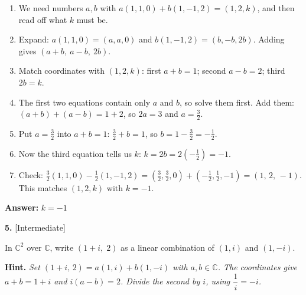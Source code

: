 \documentclass[11pt]{article}
\begin{document}
\begin{tcolorbox}[breakable,colback=ans,colframe=ansb,boxrule=0.5pt,left=4pt,right=4pt,top=2pt,bottom=2pt]\begin{enumerate}[leftmargin=2.2em,itemsep=1pt,topsep=1pt,label=\textbf{Step \arabic*.}]\item We need numbers $a,b$ with $a(1,1,0)+b(1,-1,2)=(1,2,k)$, and then read off what $k$ must be.
\item Expand: $a(1,1,0)=(a,a,0)$ and $b(1,-1,2)=(b,-b,2b)$. Adding gives $(a+b,\ a-b,\ 2b)$.
\item Match coordinates with $(1,2,k)$: first $a+b=1$; second $a-b=2$; third $2b=k$.
\item The first two equations contain only $a$ and $b$, so solve them first. Add them: $(a+b)+(a-b)=1+2$, so $2a=3$ and $a=\tfrac32$.
\item Put $a=\tfrac32$ into $a+b=1$: $\tfrac32+b=1$, so $b=1-\tfrac32=-\tfrac12$.
\item Now the third equation tells us $k$: $k=2b=2\left(-\tfrac12\right)=-1$.
\item Check: $\tfrac32(1,1,0)-\tfrac12(1,-1,2)=\left(\tfrac32,\tfrac32,0\right)+\left(-\tfrac12,\tfrac12,-1\right)=(1,\,2,\,-1)$. This matches $(1,2,k)$ with $k=-1$.
\end{enumerate}\textbf{Answer:} $k=-1$\end{tcolorbox}
\par\vspace{2pt}
\begin{minipage}{\linewidth}\textbf{5.} \hfill{\scriptsize\color{ink}[Intermediate]}\par\nopagebreak In $\mathbb{C}^{2}$ over $\mathbb{C}$, write $(1+i,\;2)$ as a linear combination of $(1,i)$ and $(1,-i)$.
\par\smallskip\begingroup\small\color{ink}\textbf{Hint.} \textit{Set $(1+i,\,2)=a(1,i)+b(1,-i)$ with $a,b\in\mathbb{C}$. The coordinates give $a+b=1+i$ and $i(a-b)=2$. Divide the second by $i$, using $\dfrac1i=-i$.}\endgroup
\end{minipage}\par\nopagebreak
\end{document}
